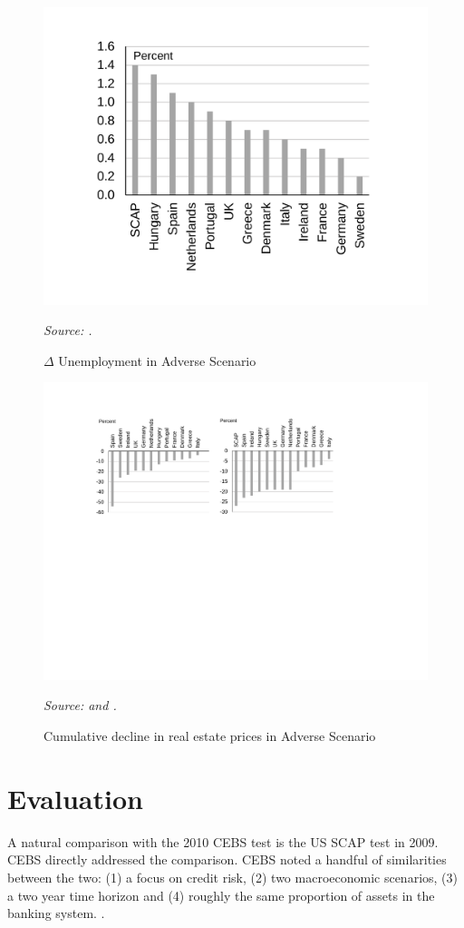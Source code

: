 \documentclass[12pt]{article}
\begin{document}
\begin{figure}[h]
\caption{$\Delta$ Unemployment in Adverse Scenario}\label{unemployment}
\centering
\includegraphics[width=.45\textwidth]{unemployment.pdf}

\raggedright
\textit{\footnotesize Source: \citet{Methodology}.}
\end{figure}

\begin{figure}[h]
\caption{Cumulative decline in real estate prices  in Adverse Scenario}\label{REforecast}
\centering
\includegraphics[width=\textwidth]{REforecast.pdf}
\raggedright
\textit{\footnotesize Source: \citet{Methodology} and \citet{SCAPResults}.}
\end{figure}

\section{Evaluation}

A natural comparison with the 2010 CEBS test is the US SCAP test in 2009. CEBS directly addressed the comparison. CEBS noted a handful of similarities between the two: (1) a focus on credit risk, (2) two macroeconomic scenarios, (3) a two year time horizon and (4) roughly the same proportion of assets in the banking system. \citep{QA}.
\end{document}
